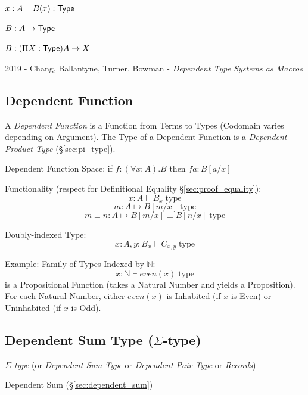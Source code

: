 \asterism


$x:A \vdash B(x):\mathsf{Type}$

$B : A \rightarrow \mathsf{Type}$

$B : (\Pi X:\mathsf{Type}) A \rightarrow X$

\asterism

2019 - Chang, Ballantyne, Turner, Bowman -
\emph{Dependent Type Systems as Macros}



\subsection{Dependent Function}\label{sec:dependent_function}

A \emph{Dependent Function} is a Function from Terms to Types (Codomain varies
depending on Argument). The Type of a Dependent Function is a \emph{Dependent
Product Type} (\S\ref{sec:pi_type}).

Dependent Function Space: if $f:(\forall x: A).B$ then $f a : B[a/x]$

Functionality (respect for Definitional Equality
\S\ref{sec:proof_equality}):
\[
  x : A \vdash B_x \;\text{type}
\]\[
  m : A \mapsto B[m/x] \;\text{type}
\]\[
  m \equiv n : A \mapsto B[m/x] \equiv B[n/x] \;\text{type}
\]

Doubly-indexed Type:
\[
  x : A, y : B_x \vdash C_{x,y} \;\text{type}
\]

Example: Family of Types Indexed by $\mathbb{N}$:
\[
  x : \mathbb{N} \vdash even(x) \;\text{type}
\]
is a Propositional Function (takes a Natural Number and yields a
Proposition). For each Natural Number, either $even(x)$ is Inhabited
(if $x$ is Even) or Uninhabited (if $x$ is Odd).\cite{harper12}



\subsection{Dependent Sum Type ($\Sigma$-type)}\label{sec:sigma_type}

\emph{$\Sigma$-type} (or \emph{Dependent Sum Type} or \emph{Dependent
  Pair Type} or \emph{Records})

Dependent Sum (\S\ref{sec:dependent_sum})


